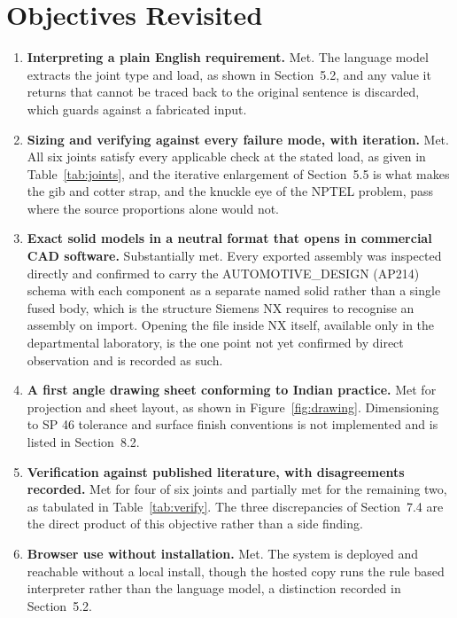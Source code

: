 \section{Objectives Revisited}
\begin{enumerate}
\item \textbf{Interpreting a plain English requirement.} Met. The language model extracts the joint type and load, as shown in Section~5.2, and any value it returns that cannot be traced back to the original sentence is discarded, which guards against a fabricated input.
\item \textbf{Sizing and verifying against every failure mode, with iteration.} Met. All six joints satisfy every applicable check at the stated load, as given in Table~\ref{tab:joints}, and the iterative enlargement of Section~5.5 is what makes the gib and cotter strap, and the knuckle eye of the NPTEL problem, pass where the source proportions alone would not.
\item \textbf{Exact solid models in a neutral format that opens in commercial CAD software.} Substantially met. Every exported assembly was inspected directly and confirmed to carry the AUTOMOTIVE\_DESIGN (AP214) schema with each component as a separate named solid rather than a single fused body, which is the structure Siemens NX requires to recognise an assembly on import. Opening the file inside NX itself, available only in the departmental laboratory, is the one point not yet confirmed by direct observation and is recorded as such.
\item \textbf{A first angle drawing sheet conforming to Indian practice.} Met for projection and sheet layout, as shown in Figure~\ref{fig:drawing}. Dimensioning to SP 46 tolerance and surface finish conventions is not implemented and is listed in Section~8.2.
\item \textbf{Verification against published literature, with disagreements recorded.} Met for four of six joints and partially met for the remaining two, as tabulated in Table~\ref{tab:verify}. The three discrepancies of Section~7.4 are the direct product of this objective rather than a side finding.
\item \textbf{Browser use without installation.} Met. The system is deployed and reachable without a local install, though the hosted copy runs the rule based interpreter rather than the language model, a distinction recorded in Section~5.2.
\end{enumerate}


